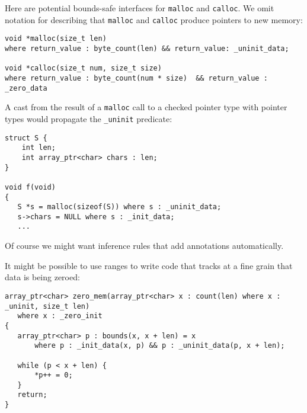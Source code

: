 Here are potential bounds-safe interfaces for \texttt{malloc} and \texttt{calloc}.
We omit notation for describing that \texttt{malloc} and \texttt{calloc} produce 
pointers to new memory:
\begin{lstlisting}
void *malloc(size_t len) 
where return_value : byte_count(len) && return_value: _uninit_data;

void *calloc(size_t num, size_t size)
where return_value : byte_count(num * size)  && return_value : _zero_data
\end{lstlisting}
A cast from the result of a \texttt{malloc} call to a checked pointer type with pointer types
would propagate the  \texttt{\_uninit} predicate:
\begin{lstlisting}
struct S {
    int len;
    int array_ptr<char> chars : len;
}

void f(void) 
{
   S *s = malloc(sizeof(S)) where s : _uninit_data;
   s->chars = NULL where s : _init_data;
   ...
\end{lstlisting}
Of course we might want inference rules that add annotations automatically.  

It might be possible to use ranges to write code that tracks at a fine grain that 
data is being zeroed:
\begin{lstlisting}
array_ptr<char> zero_mem(array_ptr<char> x : count(len) where x : _uninit, size_t len) 
   where x : _zero_init
{
   array_ptr<char> p : bounds(x, x + len) = x
       where p : _init_data(x, p) && p : _uninit_data(p, x + len);
       
   while (p < x + len) { 
       *p++ = 0;
   }
   return;
}
\end{lstlisting}
